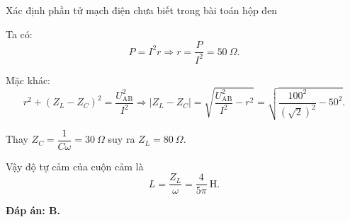 \begin{dang}{Xác định phần tử mạch điện chưa biết trong bài toán hộp đen}
{		Ta có:
		$$P = I^2r \Rightarrow r = \dfrac{P}{I^2} = 50\ \Omega.$$
		
		Mặc khác: 
		$$r^2 + (Z_L - Z_C)^2 = \dfrac{U^2_{\text{AB}}}{I^2
		} \Rightarrow |Z_L - Z_C| = \sqrt {\dfrac{U^2_{\text{AB}}}{I^2} -r^2} = \sqrt {\dfrac{100^2}{(\sqrt 2)^2} -50^2}.$$
		
		Thay $Z_C =\dfrac{1}{C\omega} = 30 \ \Omega$ suy ra $Z_L = 80\ \Omega$.
		
		Vậy độ tự cảm của cuộn cảm là
		$$L =\dfrac{Z_L}{\omega} = \dfrac{4}{5\pi} \ \text{H}.$$
		
		\textbf{Đáp án: B.}}
\end{dang}